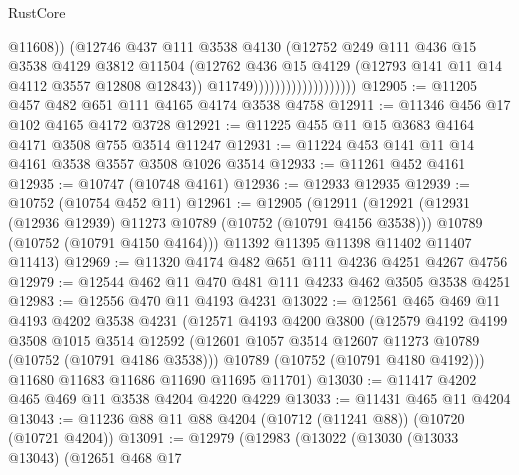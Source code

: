 \begin{lexlean}{RustCore}
\begin{coremodule}
                                          @11608))
                                      (@12746
                                        @437
                                        @111
                                        @3538
                                        @4130
                                        (@12752
                                          @249
                                          @111
                                          @436
                                          @15
                                          @3538
                                          @4129
                                          @3812
                                          @11504
                                          (@12762
                                            @436
                                            @15
                                            @4129
                                            (@12793 @141 @11 @14 @4112 @3557 @12808 @12843))
                                          @11749)))))))))))))))))))
@12905 := @11205 @457 @482 @651 @111 @4165 @4174 @3538 @4758
@12911 := @11346 @456 @17 @102 @4165 @4172 @3728
@12921 := @11225 @455 @11 @15 @3683 @4164 @4171 @3508 @755 @3514 @11247
@12931 := @11224 @453 @141 @11 @14 @4161 @3538 @3557 @3508 @1026 @3514
@12933 := @11261 @452 @4161
@12935 := @10747 (@10748 @4161)
@12936 := @12933 @12935
@12939 := @10752 (@10754 @452 @11)
@12961 := @12905
    (@12911
      (@12921
        (@12931 (@12936 @12939) @11273 @10789 (@10752 (@10791 @4156 @3538)))
        @10789
        (@10752 (@10791 @4150 @4164)))
      @11392
      @11395
      @11398
      @11402
      @11407
      @11413)
@12969 := @11320 @4174 @482 @651 @111 @4236 @4251 @4267 @4756
@12979 := @12544 @462 @11 @470 @481 @111 @4233 @462 @3505 @3538 @4251
@12983 := @12556 @470 @11 @4193 @4231
@13022 := @12561
    @465
    @469
    @11
    @4193
    @4202
    @3538
    @4231
    (@12571
      @4193
      @4200
      @3800
      (@12579
        @4192
        @4199
        @3508
        @1015
        @3514
        @12592
        (@12601 @1057 @3514 @12607 @11273 @10789 (@10752 (@10791 @4186 @3538)))
        @10789
        (@10752 (@10791 @4180 @4192)))
      @11680
      @11683
      @11686
      @11690
      @11695
      @11701)
@13030 := @11417 @4202 @465 @469 @11 @3538 @4204 @4220 @4229
@13033 := @11431 @465 @11 @4204
@13043 := @11236 @88 @11 @88 @4204 (@10712 (@11241 @88)) (@10720 (@10721 @4204))
@13091 := @12979
    (@12983
      (@13022
        (@13030
          (@13033 @13043)
          (@12651
            @468
            @17

\end{coremodule}
\end{lexlean}

